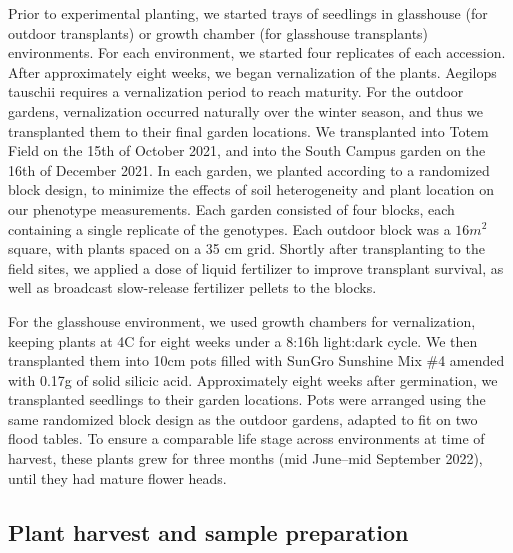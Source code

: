 \documentclass[12pt, letterpaper]{report}
\begin{document}
Prior to experimental planting, we started trays of seedlings in glasshouse (for outdoor transplants) or growth chamber (for glasshouse transplants) environments. For each environment, we started four replicates of each accession. After approximately eight weeks, we began vernalization of the plants. Aegilops tauschii requires a vernalization period to reach maturity. For the outdoor gardens, vernalization occurred naturally over the winter season, and thus we transplanted them to their final garden locations. We transplanted into Totem Field on the 15th of October 2021, and into the South Campus garden on the 16th of December 2021. In each garden, we planted according to a randomized block design, to minimize the effects of soil heterogeneity and plant location on our phenotype measurements. Each garden consisted of four blocks, each containing a single replicate of the genotypes. Each outdoor block was a $16 m^2$  square, with plants spaced on a 35 cm grid. Shortly after transplanting to the field sites, we applied a dose of liquid fertilizer to improve transplant survival, as well as broadcast slow-release fertilizer pellets to the blocks. 

For the glasshouse environment, we used growth chambers for vernalization, keeping plants at 4\degree C for eight weeks under a 8:16h light:dark cycle.  We then transplanted them into 10cm pots filled with SunGro Sunshine Mix \#4 amended with 0.17g of solid silicic acid. Approximately eight weeks after germination, we transplanted seedlings to their garden locations. Pots were arranged using the same randomized block design as the outdoor gardens, adapted to fit on two flood tables. To ensure a comparable life stage across environments at time of harvest, these plants grew for three months (mid June--mid September 2022), until they had mature flower heads. 

\subsection{Plant harvest and sample preparation}
\end{document}
